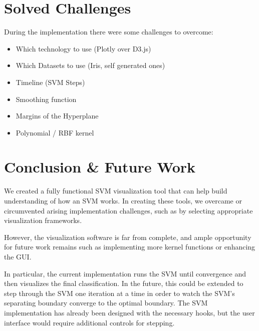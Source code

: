 \documentclass{scrartcl}
\begin{document}





\section{Solved Challenges}

During the implementation there were some challenges to overcome:

\begin{itemize}
	\item Which technology to use (Plotly over D3.js)
	\item Which Datasets to use (Iris, self generated ones)
	\item Timeline (SVM Steps) 
	\item Smoothing function
	\item Margins of the Hyperplane
	\item Polynomial / RBF kernel 
\end{itemize}




\section{Conclusion \& Future Work}

We created a fully functional SVM visualization tool
that can help build understanding of how an SVM works.
In creating these tools, we overcame or circumvented arising implementation challenges,
such as by selecting appropriate visualization frameworks.

However, the visualization software is far from complete,
and ample opportunity for future work remains
such as implementing more kernel functions or enhancing the GUI.

In particular, the current implementation runs the SVM until convergence
and then visualizes the final classification.
In the future, this could be extended
to step through the SVM one iteration at a time
in order to watch the SVM's separating boundary converge to the optimal boundary.
The SVM implementation has already been designed with the necessary hooks,
but the user interface would require additional controls for stepping.
\end{document}
